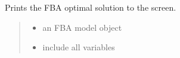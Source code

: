 \documentclass[letterpaper,12pt,english]{sphinxmanual}
\begin{document}
\begin{fulllineitems}

\pysigstartsignatures
\pysiglinewithargsret
{}
{\sphinxparamcomma {}}
{}
\pysigstopsignatures
\sphinxAtStartPar
Prints the FBA optimal solution to the screen.
\begin{quote}\begin{description}
\begin{itemize}
\item {} 
\sphinxAtStartPar
{} \textendash{} an FBA model object

\item {} 
\sphinxAtStartPar
{} \textendash{} include all variables

\end{itemize}

\end{description}\end{quote}

\end{fulllineitems}
\end{document}

